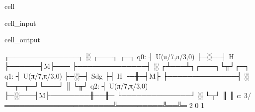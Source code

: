 \documentclass[letterpaper,10pt,english]{jupyterBook}
\begin{document}
\begin{sphinxuseclass}{cell}
\begin{sphinxVerbatimInput}
\begin{sphinxuseclass}{cell_input}
\begin{sphinxVerbatim}[commandchars=\\\{\}]
\end{sphinxVerbatim}

\end{sphinxuseclass}\end{sphinxVerbatimInput}
\begin{sphinxVerbatimOutput}

\begin{sphinxuseclass}{cell_output}
\begin{sphinxVerbatim}[commandchars=\\\{\}]
     ┌──────────────┐ ░  ┌───┐      ┌─┐
q\PYGZus{}0: ┤ U(π/7,π/3,0) ├─░──┤ H ├──────┤M├───
     ├──────────────┤ ░ ┌┴───┴┐┌───┐└╥┘┌─┐
q\PYGZus{}1: ┤ U(π/7,π/3,0) ├─░─┤ Sdg ├┤ H ├─╫─┤M├
     ├──────────────┤ ░ └─┬─┬─┘└───┘ ║ └╥┘
q\PYGZus{}2: ┤ U(π/7,π/3,0) ├─░───┤M├────────╫──╫─
     └──────────────┘ ░   └╥┘        ║  ║
c: 3/══════════════════════╩═════════╩══╩═
                           2         0  1
\end{sphinxVerbatim}

\end{sphinxuseclass}\end{sphinxVerbatimOutput}

\end{sphinxuseclass}
\end{document}

